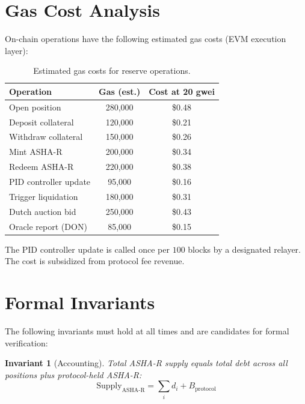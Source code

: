 \documentclass[11pt,a4paper]{article}
\newcommand{\ashares}{\textsc{ASHA-R}\xspace}
\newtheorem{invariant}{Invariant}
\begin{document}
\section{Gas Cost Analysis}
\label{app:gas}

On-chain operations have the following estimated gas costs (EVM execution layer):

\begin{table}[H]
\centering
\caption{Estimated gas costs for reserve operations.}
\label{tab:gas}
\begin{tabular}{@{}lcc@{}}
\toprule
\textbf{Operation} & \textbf{Gas (est.)} & \textbf{Cost at 20 gwei} \\
\midrule
Open position                  & 280{,}000 & \$0.48 \\
Deposit collateral             & 120{,}000 & \$0.21 \\
Withdraw collateral            & 150{,}000 & \$0.26 \\
Mint \ashares                  & 200{,}000 & \$0.34 \\
Redeem \ashares                & 220{,}000 & \$0.38 \\
PID controller update          & 95{,}000  & \$0.16 \\
Trigger liquidation            & 180{,}000 & \$0.31 \\
Dutch auction bid              & 250{,}000 & \$0.43 \\
Oracle report (DON)            & 85{,}000  & \$0.15 \\
\bottomrule
\end{tabular}
\end{table}

The PID controller update is called once per $100$ blocks by a designated relayer.
The cost is subsidized from protocol fee revenue.

\section{Formal Invariants}
\label{app:invariants}

The following invariants must hold at all times and are candidates for formal verification:

\begin{invariant}[Accounting]
Total \ashares supply equals total debt across all positions plus protocol-held \ashares:
\begin{equation}
  \text{Supply}_{\text{ASHA-R}} = \sum_{i} d_i + B_{\text{protocol}}
\end{equation}
\end{invariant}
\end{document}
